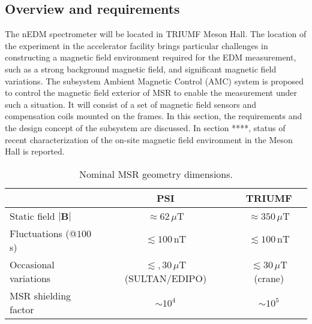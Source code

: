 \subsection{Overview and requirements}
The nEDM spectrometer will be located in TRIUMF Meson Hall. The location of the experiment in the accelerator facility brings particular challenges in constructing a magnetic field environment required for the EDM measurement, such as a strong background magnetic field, and significant magnetic field variations.  The subsystem Ambient Magnetic Control (AMC) system is proposed to control the magnetic field exterior of MSR to enable the measurement under such a situation. It will consist of a set of magnetic field sensors and compensation coils mounted on the frames.  In this section, the requirements and the design concept of the subsystem are discussed. In section ****, status of recent characterization of the on-site magnetic field environment in the Meson Hall is reported.  


\begin{table}[htb!]
\centering 
\begin{tabular}{|l||c|c|}
\hline

 & \multicolumn{1}{c|}{\cellcolor[HTML]{ECF4FF}\textbf{PSI}} & \multicolumn{1}{c|}{\cellcolor[HTML]{ECF4FF}\textbf{TRIUMF}} \\ \hline
Static field $| \bm{B}|$ & $\approx62\,\mu$T     & $\approx 350\,\mu$T                       \\ \hline
Fluctuations (@$100\,$s) & $\lesssim 100\,\mathrm{nT}$ & $\lesssim 100\,\mathrm{nT}$ \\ \hline
Occasional variations    & $\lesssim,30\,\mu$T (SULTAN/EDIPO)        & $\lesssim 30\,\mu$T (crane)               \\ \hline
 MSR shielding  factor       &    $\sim 10^4$   &   $\sim 10^5$   \\ \hline 

\end{tabular}
\caption{Nominal MSR geometry dimensions.}
\label{tab:msr_geom}
\end{table}



